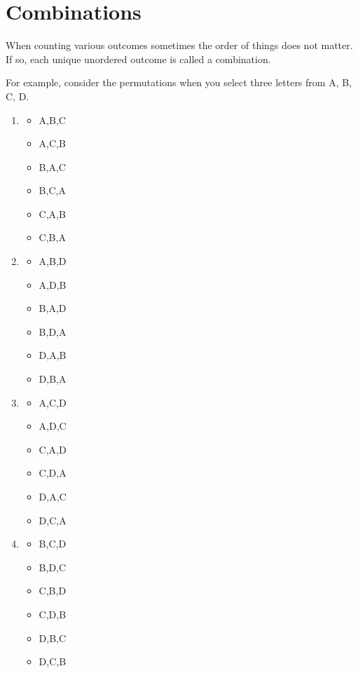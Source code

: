 \documentclass[10pt,]{book}
\theoremstyle{plain}
\theoremstyle{definition}
\theoremstyle{definition}
\theoremstyle{definition}
\numberwithin{equation}{section}
\begin{document}
\section[{Combinations}]{Combinations}\label{section-17}
When counting various outcomes sometimes the order of things does not matter.
If so, each unique unordered outcome is called a combination. %
\par

For example, consider the permutations when you select three letters from {A, B, C, D}.
\leavevmode%
\begin{enumerate}
\item\hypertarget{li-74}{}%
\begin{itemize}[label=\textbullet]
\item{}A,B,C%
\item{}A,C,B%
\item{}B,A,C%
\item{}B,C,A%
\item{}C,A,B%
\item{}C,B,A%
\end{itemize}
%
\item\hypertarget{li-81}{}%
\begin{itemize}[label=\textbullet]
\item{}A,B,D%
\item{}A,D,B%
\item{}B,A,D%
\item{}B,D,A%
\item{}D,A,B%
\item{}D,B,A%
\end{itemize}
%
\item\hypertarget{li-88}{}%
\begin{itemize}[label=\textbullet]
\item{}A,C,D%
\item{}A,D,C%
\item{}C,A,D%
\item{}C,D,A%
\item{}D,A,C%
\item{}D,C,A%
\end{itemize}
%
\item\hypertarget{li-95}{}%
\begin{itemize}[label=\textbullet]
\item{}B,C,D%
\item{}B,D,C%
\item{}C,B,D%
\item{}C,D,B%
\item{}D,B,C%
\item{}D,C,B%
\end{itemize}
%
\end{enumerate}
\end{document}
